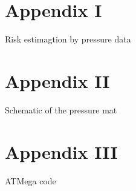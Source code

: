\chapter*{Appendix I}
\label{chapter:appendix1}

Risk estimagtion by pressure data


\chapter*{Appendix II}
\label{chapter:appendix2}

Schematic of the pressure mat

% 


\chapter*{Appendix III}
\label{chapter:appendix3}

ATMega code

\cite{Anurag17}